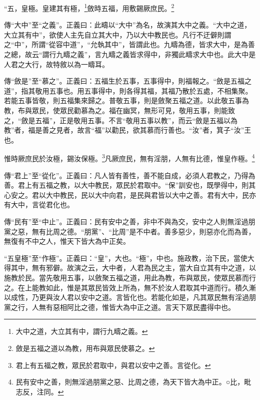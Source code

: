 “五，皇極。皇建其有極，\footnote{大中之道，大立其有中，謂行九疇之義。}斂時五福，用敷錫厥庶民。\footnote{斂是五福之道以為教，用布與眾民使慕之。}


{\noindent\zhuan{}\fzbyks 傳“大中”至“之義”。正義曰：此疇以“大中”為名，故演其大中之義。“大中之道，大立其有中”，欲使人主先自立其大中，乃以大中教民也。凡行不迂僻則謂之“中”，所謂“從容中道”，“允執其中”，皆謂此也。九疇為德，皆求大中，是為善之總，故云“謂行九疇之義”，言九疇之義皆求得中，非獨此疇求大中也。此大中是人君之大行，故特敘以為一疇耳。 \par}

{\noindent\zhuan{}\fzbyks 傳“斂是”至“慕之”。正義曰：五福生於五事，五事得中，則福報之。“斂是五福之道”，指其敬用五事也。用五事得中，則各得其福，其福乃散於五處，不相集聚。若能五事皆敬，則五福集來歸之。普敬五事，則是斂聚五福之道。以此敬五事為教，布與眾民，使眾民勸慕為之。福在幽冥，無形可見，敬用五事，則能致之，“斂是五福”，正是敬用五事。不言“敬用五事以教”，而云“斂是五福以為教”者，福是善之見者，故言“福”以勸民，欲其慕而行善也。“汝”者，箕子“汝”王也。 \par}

惟時厥庶民於汝極，錫汝保極。\footnote{君上有五福之教，眾民於君取中，與君以安中之善。言從化。}凡厥庶民，無有淫朋，人無有比德，惟皇作極。\footnote{民有安中之善，則無淫過朋黨之惡、比周之德，為天下皆大為中正。○比，毗志反，注同。}

{\noindent\zhuan{}\fzbyks 傳“君上”至“從化”。正義曰：凡人皆有善性，善不能自成，必須人君教之，乃得為善。君上有五福之教，以大中教民，眾民於君取中。“保”訓安也，既學得中，則其心安之。君以大中教民，民以大中向君，是民與君皆以大中之善。君有大中，民亦有大中，言從君化也。 \par}

{\noindent\zhuan{}\fzbyks 傳“民有”至“中止”。正義曰：民有安中之善，非中不與為交，安中之人則無淫過朋黨之惡，無有比周之德。“朋黨”、“比周”是不中者。善多惡少，則惡亦化而為善，無復有不中之人，惟天下皆大為中正矣。 \par}

{\noindent\shu{}\fzkt “五皇極”至“作極”。正義曰：“皇”，大也。“極”，中也。施政教，治下民，當使大得其中，無有邪僻。故演之云，大中者，人君為民之主，當大自立其有中之道，以施教於民。當先敬用五事，以斂聚五福之道，用此為教，布與眾民，使眾民慕而行之。在上能教如此，惟是其眾民皆效上所為，無不於汝人君取其中道而行。積久漸以成性，乃更與汝人君以安中之道。言皆化也。若能化如是，凡其眾民無有淫過朋黨之行，人無有惡相阿比之德，惟皆大為中正之道。言天下眾民盡得中也。 \par}

